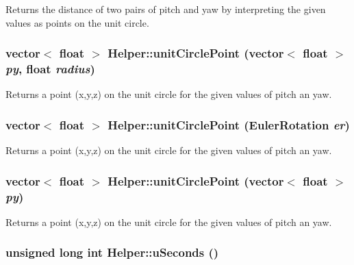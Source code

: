 Returns the distance of two pairs of pitch and yaw by interpreting the given values as points on the unit circle. \hypertarget{classHelper_afa41ef859921304ac59f929d1fd2d198}{
\subsubsection[{unitCirclePoint}]{\setlength{\rightskip}{0pt plus 5cm}vector$<$ float $>$ Helper::unitCirclePoint (vector$<$ float $>$ {\em py}, \/  float {\em radius})}}
\label{classHelper_afa41ef859921304ac59f929d1fd2d198}
Returns a point (x,y,z) on the unit circle for the given values of pitch an yaw. \hypertarget{classHelper_a595867363dc9fb28e03031b6c0137bf8}{
\subsubsection[{unitCirclePoint}]{\setlength{\rightskip}{0pt plus 5cm}vector$<$ float $>$ Helper::unitCirclePoint ({\bf EulerRotation} {\em er})}}
\label{classHelper_a595867363dc9fb28e03031b6c0137bf8}
Returns a point (x,y,z) on the unit circle for the given values of pitch an yaw. \hypertarget{classHelper_a116f977e6308bd37ce24793969b4492a}{
\subsubsection[{unitCirclePoint}]{\setlength{\rightskip}{0pt plus 5cm}vector$<$ float $>$ Helper::unitCirclePoint (vector$<$ float $>$ {\em py})}}
\label{classHelper_a116f977e6308bd37ce24793969b4492a}
Returns a point (x,y,z) on the unit circle for the given values of pitch an yaw. \hypertarget{classHelper_ae66525ac48753d71d802b053cd9d4178}{
\subsubsection[{uSeconds}]{\setlength{\rightskip}{0pt plus 5cm}unsigned long int Helper::uSeconds ()}}
